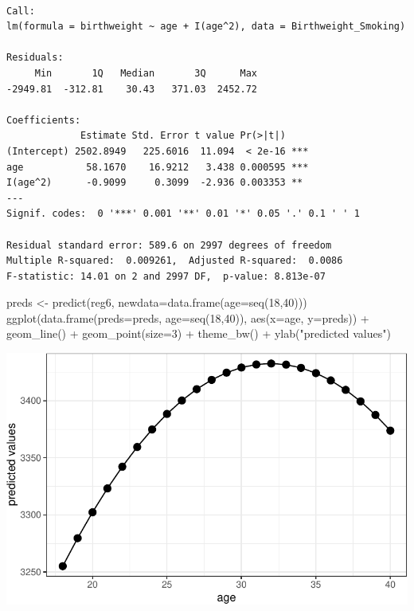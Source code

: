 \documentclass[
  letterpaper,
  DIV=11,
  numbers=noendperiod]{scrreprt}
\newenvironment{Shaded}{\begin{snugshade}}{\end{snugshade}}
\newcommand{\AttributeTok}[1]{\textcolor[rgb]{0.40,0.45,0.13}{#1}}
\newcommand{\DecValTok}[1]{\textcolor[rgb]{0.68,0.00,0.00}{#1}}
\newcommand{\FunctionTok}[1]{\textcolor[rgb]{0.28,0.35,0.67}{#1}}
\newcommand{\NormalTok}[1]{\textcolor[rgb]{0.00,0.23,0.31}{#1}}
\newcommand{\OtherTok}[1]{\textcolor[rgb]{0.00,0.23,0.31}{#1}}
\newcommand{\SpecialCharTok}[1]{\textcolor[rgb]{0.37,0.37,0.37}{#1}}
\newcommand{\StringTok}[1]{\textcolor[rgb]{0.13,0.47,0.30}{#1}}
\begin{document}
\begin{verbatim}

Call:
lm(formula = birthweight ~ age + I(age^2), data = Birthweight_Smoking)

Residuals:
     Min       1Q   Median       3Q      Max 
-2949.81  -312.81    30.43   371.03  2452.72 

Coefficients:
             Estimate Std. Error t value Pr(>|t|)    
(Intercept) 2502.8949   225.6016  11.094  < 2e-16 ***
age           58.1670    16.9212   3.438 0.000595 ***
I(age^2)      -0.9099     0.3099  -2.936 0.003353 ** 
---
Signif. codes:  0 '***' 0.001 '**' 0.01 '*' 0.05 '.' 0.1 ' ' 1

Residual standard error: 589.6 on 2997 degrees of freedom
Multiple R-squared:  0.009261,  Adjusted R-squared:  0.0086 
F-statistic: 14.01 on 2 and 2997 DF,  p-value: 8.813e-07
\end{verbatim}

\begin{Shaded}
\begin{Highlighting}[]
\NormalTok{preds }\OtherTok{\textless{}{-}} \FunctionTok{predict}\NormalTok{(reg6, }\AttributeTok{newdata=}\FunctionTok{data.frame}\NormalTok{(}\AttributeTok{age=}\FunctionTok{seq}\NormalTok{(}\DecValTok{18}\NormalTok{,}\DecValTok{40}\NormalTok{)))}
\FunctionTok{ggplot}\NormalTok{(}\FunctionTok{data.frame}\NormalTok{(}\AttributeTok{preds=}\NormalTok{preds, }\AttributeTok{age=}\FunctionTok{seq}\NormalTok{(}\DecValTok{18}\NormalTok{,}\DecValTok{40}\NormalTok{)), }\FunctionTok{aes}\NormalTok{(}\AttributeTok{x=}\NormalTok{age, }\AttributeTok{y=}\NormalTok{preds)) }\SpecialCharTok{+} 
  \FunctionTok{geom\_line}\NormalTok{() }\SpecialCharTok{+} 
  \FunctionTok{geom\_point}\NormalTok{(}\AttributeTok{size=}\DecValTok{3}\NormalTok{) }\SpecialCharTok{+} 
  \FunctionTok{theme\_bw}\NormalTok{() }\SpecialCharTok{+} 
  \FunctionTok{ylab}\NormalTok{(}\StringTok{"predicted values"}\NormalTok{)}
\end{Highlighting}
\end{Shaded}

\includegraphics{04-linear_regression_files/figure-pdf/unnamed-chunk-24-1.pdf}
\end{document}
